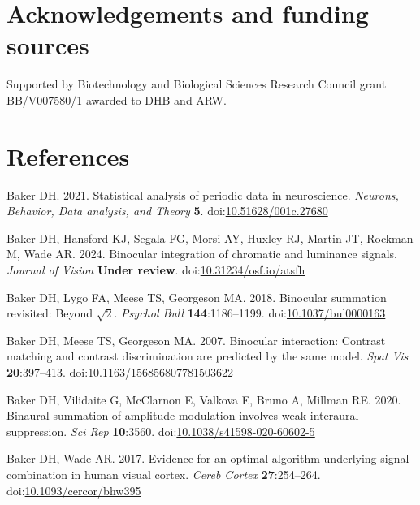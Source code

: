 \documentclass[
]{article}
\begin{document}
\hypertarget{acknowledgements-and-funding-sources}{%
\section{Acknowledgements and funding sources}\label{acknowledgements-and-funding-sources}}

Supported by Biotechnology and Biological Sciences Research Council grant BB/V007580/1 awarded to DHB and ARW.

\hypertarget{references}{%
\section{References}\label{references}}

\hypertarget{refs}{}
\leavevmode\hypertarget{ref-Baker2021}{}%
Baker DH. 2021. Statistical analysis of periodic data in neuroscience. \emph{Neurons, Behavior, Data analysis, and Theory} \textbf{5}. doi:\href{https://doi.org/10.51628/001c.27680}{10.51628/001c.27680}

\leavevmode\hypertarget{ref-Baker2024}{}%
Baker DH, Hansford KJ, Segala FG, Morsi AY, Huxley RJ, Martin JT, Rockman M, Wade AR. 2024. Binocular integration of chromatic and luminance signals. \emph{Journal of Vision} \textbf{Under review}. doi:\href{https://doi.org/10.31234/osf.io/atsfh}{10.31234/osf.io/atsfh}

\leavevmode\hypertarget{ref-Baker2018}{}%
Baker DH, Lygo FA, Meese TS, Georgeson MA. 2018. Binocular summation revisited: Beyond \(\sqrt{2}\). \emph{Psychol Bull} \textbf{144}:1186--1199. doi:\href{https://doi.org/10.1037/bul0000163}{10.1037/bul0000163}

\leavevmode\hypertarget{ref-Baker2007}{}%
Baker DH, Meese TS, Georgeson MA. 2007. Binocular interaction: Contrast matching and contrast discrimination are predicted by the same model. \emph{Spat Vis} \textbf{20}:397--413. doi:\href{https://doi.org/10.1163/156856807781503622}{10.1163/156856807781503622}

\leavevmode\hypertarget{ref-Baker2020}{}%
Baker DH, Vilidaite G, McClarnon E, Valkova E, Bruno A, Millman RE. 2020. Binaural summation of amplitude modulation involves weak interaural suppression. \emph{Sci Rep} \textbf{10}:3560. doi:\href{https://doi.org/10.1038/s41598-020-60602-5}{10.1038/s41598-020-60602-5}

\leavevmode\hypertarget{ref-Baker2017}{}%
Baker DH, Wade AR. 2017. Evidence for an optimal algorithm underlying signal combination in human visual cortex. \emph{Cereb Cortex} \textbf{27}:254--264. doi:\href{https://doi.org/10.1093/cercor/bhw395}{10.1093/cercor/bhw395}
\end{document}
